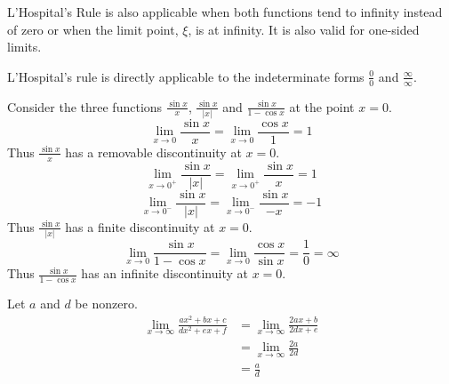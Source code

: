L'Hospital's Rule is also applicable when both functions tend to infinity
instead of zero or when the limit point, $\xi$, is at infinity.  It 
is also valid for one-sided limits.


L'Hospital's rule is directly applicable to the indeterminate forms
$\frac{0}{0}$ and $\frac{\infty}{\infty}$.


\begin{example}
{\rm
  Consider the three functions $\frac{\sin x}{x}$, $\frac{\sin x}{|x|}$ and
  $\frac{\sin x}{1 - \cos x}$ at the point $x = 0$.
  \[
  \lim_{x \to 0} \frac{\sin x}{x}
  = \lim_{x \to 0} \frac{\cos x}{1} 
  = 1
  \]
  Thus $\frac{\sin x}{x}$ has a removable discontinuity at $x = 0$.
  \[
  \lim_{x \to 0^+} \frac{\sin x}{|x|}
  = \lim_{x \to 0^+} \frac{\sin x}{x} = 1
  \]
  \[
  \lim_{x \to 0^-} \frac{\sin x}{|x|}
  = \lim_{x \to 0^-} \frac{\sin x}{-x} = -1
  \]
  Thus $\frac{\sin x}{|x|}$ has a finite discontinuity at $x = 0$.
  \[
  \lim_{x \to 0} \frac{\sin x}{1 - \cos x}
  = \lim_{x \to 0} \frac{\cos x}{\sin x}
  = \frac{1}{0} = \infty
  \]
  Thus $\frac{\sin x}{1 - \cos x}$ has an infinite discontinuity at $x = 0$.
}
\end{example}






\begin{example}
{\rm
  Let $a$ and $d$ be nonzero.
  \begin{align*}
    \lim_{x \to \infty} \frac{a x^2 + b x + c}{d x^2 + e x + f}
    &= \lim_{x \to \infty} \frac{2 a x + b}{2 d x + e} \\
    &= \lim_{x \to \infty} \frac{2 a}{2 d} \\
    &= \frac{a}{d}
  \end{align*}
}
\end{example}





